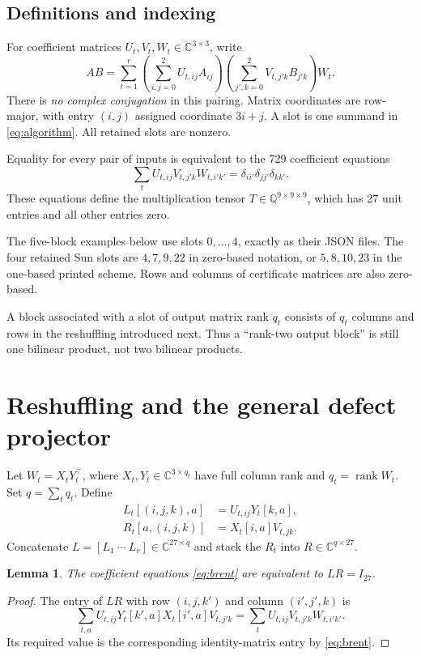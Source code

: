 \documentclass[11pt]{article}
\newtheorem{lemma}[theorem]{Lemma}
\theoremstyle{definition}\newtheorem{definition}[theorem]{Definition}
\newcommand{\C}{\mathbb C}\newcommand{\Q}{\mathbb Q}
\newcommand{\rank}{\operatorname{rank}}
\begin{document}
\subsection{Definitions and indexing}
For coefficient matrices $U_t,V_t,W_t\in\C^{3\times3}$, write
\begin{equation}\label{eq:algorithm}
AB=\sum_{t=1}^{r}\left(\sum_{i,j=0}^{2}U_{t,ij}A_{ij}\right)
\left(\sum_{j',k=0}^{2}V_{t,j'k}B_{j'k}\right)W_t.
\end{equation}
There is \emph{no complex conjugation} in this pairing. Matrix coordinates are row-major, with entry $(i,j)$ assigned coordinate $3i+j$. A slot is one summand in \eqref{eq:algorithm}. All retained slots are nonzero.

Equality for every pair of inputs is equivalent to the 729 coefficient equations
\begin{equation}\label{eq:brent}
\sum_t U_{t,ij}V_{t,j'k}W_{t,i'k'}
=\delta_{ii'}\delta_{jj'}\delta_{kk'}.
\end{equation}
These equations define the multiplication tensor $T\in\Q^{9\times9\times9}$, which has 27 unit entries and all other entries zero.

The five-block examples below use slots $0,\ldots,4$, exactly as their JSON files. The four retained Sun slots are $4,7,9,22$ in zero-based notation, or $5,8,10,23$ in the one-based printed scheme. Rows and columns of certificate matrices are also zero-based.

A block associated with a slot of output matrix rank $q_t$ consists of $q_t$ columns and rows in the reshuffling introduced next. Thus a ``rank-two output block'' is still one bilinear product, not two bilinear products.

\section{Reshuffling and the general defect projector}\label{sec:defect}
Let $W_t=X_tY_t^\top$, where $X_t,Y_t\in\C^{3\times q_t}$ have full column rank and $q_t=\rank W_t$. Set $q=\sum_t q_t$. Define
\begin{align}
L_t[(i,j,k),a]&=U_{t,ij}Y_t[k,a],\label{eq:L}\\
R_t[a,(i,j,k)]&=X_t[i,a]V_{t,jk}.\label{eq:R}
\end{align}
Concatenate $L=[L_1\ \cdots\ L_r]\in\C^{27\times q}$ and stack the $R_t$ into $R\in\C^{q\times27}$.

\begin{lemma}\label{lem:reshape}
The coefficient equations \eqref{eq:brent} are equivalent to $LR=I_{27}$.
\end{lemma}
\begin{proof}
The entry of $LR$ with row $(i,j,k')$ and column $(i',j',k)$ is
\[
\sum_{t,a}U_{t,ij}Y_t[k',a]X_t[i',a]V_{t,j'k}
=\sum_t U_{t,ij}V_{t,j'k}W_{t,i'k'}.
\]
Its required value is the corresponding identity-matrix entry by \eqref{eq:brent}.
\end{proof}
\end{document}
